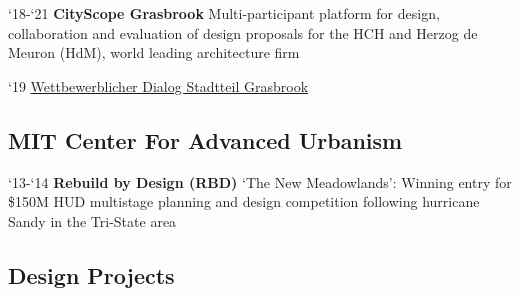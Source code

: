 \begin{tablist}
    \item[`18-`21] \tab \textbf{CityScope Grasbrook} {Multi-participant platform for design, collaboration and evaluation of design proposals for the HCH and Herzog de Meuron (HdM), world leading architecture firm}


    \begin{tablist}

        \item[`19] \tab \href{https://www.dropbox.com/sh/ozudl0rm7s78xwp/AAC7h_isLyXeCMCgBAxboDrDa?dl=0}{Wettbewerblicher Dialog Stadtteil Grasbrook}
    \end{tablist}




\end{tablist}


\subsection*{MIT Center For Advanced Urbanism}



\begin{tablist}

    \item[`13-`14] \tab \textbf{Rebuild by Design (RBD)}
    {‘The New Meadowlands’: Winning entry for \$150M HUD multistage planning and design competition following hurricane Sandy in the Tri-State area}
\end{tablist}


\subsection*{Design Projects}


